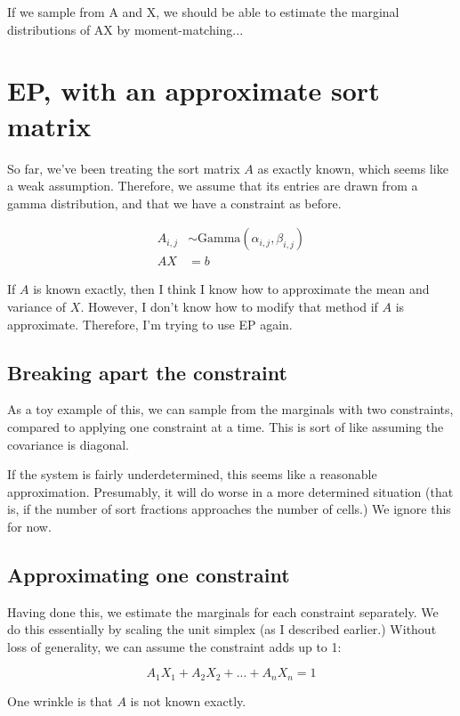 \documentclass{article}\usepackage[]{graphicx}\usepackage[]{color}
\begin{document}
If we sample from A and X, we should be able to estimate the marginal distributions
of AX by moment-matching...





\section{EP, with an approximate sort matrix}

So far, we've been treating the sort matrix $A$ as exactly known,
which seems like a weak assumption. Therefore, we assume that
its entries are drawn from a gamma distribution, and that
we have a constraint as before.

\begin{align*}
A_{i,j} &\sim \mathrm{Gamma}(\alpha_{i,j},\beta_{i,j}) \\
AX &= b
\end{align*}

If $A$ is known exactly, then I think I know how to approximate
the mean and variance of $X$. However, I don't know how to
modify that method if $A$ is approximate. Therefore, I'm
trying to use EP again.

\subsection{Breaking apart the constraint}

As a toy example of this, we can sample from the
marginals with two constraints, compared to applying
one constraint at a time. This is sort of like assuming
the covariance is diagonal.

If the system is fairly underdetermined, this seems like a
reasonable approximation. Presumably, it will do worse
in a more determined situation (that is, if the number
of sort fractions approaches the number of cells.) We
ignore this for now.

\subsection{Approximating one constraint}

Having done this, we estimate the marginals for each
constraint separately. We do this essentially by
scaling the unit simplex (as I described earlier.)
Without loss of generality, we can assume the constraint
adds up to 1:

\[
A_1 X_1 + A_2 X_2 + ... + A_n X_n = 1
\]

One wrinkle is that $A$ is not known exactly.
\end{document}
